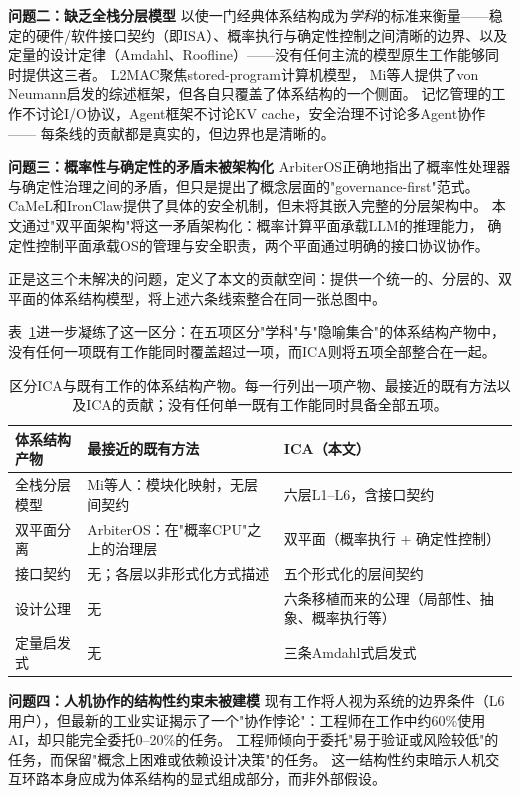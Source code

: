 \textbf{问题二：缺乏全栈分层模型}
以使一门经典体系结构成为\emph{学科}的标准来衡量——稳定的硬件/软件接口契约（即ISA）、概率执行与确定性控制之间清晰的边界、以及定量的设计定律（Amdahl、Roofline）\cite{hennessy2017quantitative}——没有任何主流的模型原生工作能够同时提供这三者。
L2MAC\cite{holt2024l2mac}聚焦stored-program计算机模型，
Mi等人\cite{mi2025llmagentscomputersystems}提供了von Neumann启发的综述框架，但各自只覆盖了体系结构的一个侧面。
记忆管理的工作不讨论I/O协议，Agent框架不讨论KV cache，安全治理不讨论多Agent协作——%
每条线的贡献都是真实的，但边界也是清晰的。

\textbf{问题三：概率性与确定性的矛盾未被架构化}
ArbiterOS\cite{arbiteros2025}正确地指出了概率性处理器与确定性治理之间的矛盾，但只是提出了概念层面的"governance-first"范式。
CaMeL\cite{debenedetti2025camel}和IronClaw\cite{ironclaw2025}提供了具体的安全机制，但未将其嵌入完整的分层架构中。
本文通过"双平面架构"将这一矛盾架构化：概率计算平面承载LLM的推理能力，
确定性控制平面承载OS的管理与安全职责，两个平面通过明确的接口协议协作。

正是这三个未解决的问题，定义了本文的贡献空间：提供一个统一的、分层的、双平面的体系结构模型，将上述六条线索整合在同一张总图中。

表~\ref{tab:artifact-comparison}进一步凝练了这一区分：在五项区分"学科"与"隐喻集合"的体系结构产物中，没有任何一项既有工作能同时覆盖超过一项，而ICA则将五项全部整合在一起。

\begin{table}[h]
\centering
\footnotesize
\caption{区分ICA与既有工作的体系结构产物。每一行列出一项产物、最接近的既有方法以及ICA的贡献；没有任何单一既有工作能同时具备全部五项。}
\label{tab:artifact-comparison}
\begin{tabularx}{\textwidth}{>{\raggedright\arraybackslash}p{}>{\raggedright\arraybackslash}p{}>{\raggedright\arraybackslash}p{}}
\toprule
\textbf{体系结构产物} & \textbf{最接近的既有方法} & \textbf{ICA（本文）} \\
\midrule
全栈分层模型 & Mi等人\cite{mi2025llmagentscomputersystems}：模块化映射，无层间契约 & 六层L1--L6，含接口契约 \\
双平面分离 & ArbiterOS\cite{arbiteros2025}：在"概率CPU"之上的治理层 & 双平面（概率执行 + 确定性控制） \\
接口契约 & 无；各层以非形式化方式描述 & 五个形式化的层间契约 \\
设计公理 & 无 & 六条移植而来的公理（局部性、抽象、概率执行等） \\
定量启发式 & 无 & 三条Amdahl式启发式 \\
\bottomrule
\end{tabularx}
\end{table}

\textbf{问题四：人机协作的结构性约束未被建模}
现有工作将人视为系统的边界条件（L6用户），但最新的工业实证揭示了一个"协作悖论"：工程师在工作中约60\%使用AI，却只能完全委托0--20\%的任务\cite{anthropic2026agenticreport}。
工程师倾向于委托"易于验证或风险较低"的任务，而保留"概念上困难或依赖设计决策"的任务。
这一结构性约束暗示人机交互环路本身应成为体系结构的显式组成部分，而非外部假设。%
